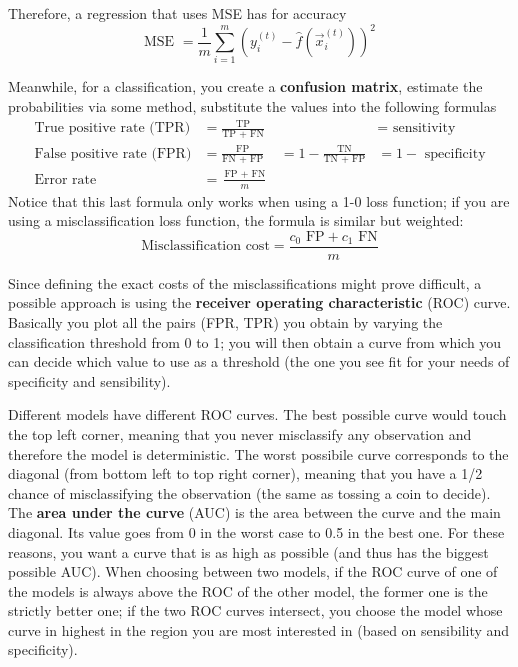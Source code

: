     Therefore, a regression that uses MSE has for accuracy
    $$\text{MSE } = \frac{1}{m} \sum_{i = 1}^{m}\left(y_i^{(t)} - 
                    \hat{f}\left(\vec{x}_i^{(t)}\right)\right)^2$$
    
    Meanwhile, for a classification, you create a \textbf{confusion matrix}, estimate the probabilities via some method, substitute the values into the following formulas
    \begin{align*}
      \text{True positive rate (TPR)} &= \frac{\text{TP}}{\text{TP } + \text{ FN}} &
        &= \text{ sensitivity} \\
      \text{False positive rate (FPR)} &= \frac{\text{FP}}{\text{FN } + \text{ FP}} 
        &= 1 - \frac{\text{TN}}{\text{TN } + \text{ FP}} &= 1 - \text{ specificity} \\
      \text{Error rate} &= \frac{\text{FP } + \text{ FN}}{m}
    \end{align*}
    Notice that this last formula only works when using a 1-0 loss function; if you are using a misclassification loss function, the formula is similar but weighted:
    $$\text{Misclassification cost}= \frac{c_0 \text{ FP} + c_1 \text{ FN}}{m}$$

    Since defining the exact costs of the misclassifications might prove difficult, a possible approach is using the \textbf{receiver operating characteristic} (ROC) curve. Basically you plot all the pairs (FPR, TPR) you obtain by varying the classification threshold from 0 to 1;
    you will then obtain a curve from which you can decide which value to use as a threshold (the one you see fit for your needs of specificity and sensibility). 
   

    Different models have different ROC curves.
    The best possible curve would touch the top left corner, meaning that you never misclassify any observation and therefore the model is deterministic.
    The worst possibile curve corresponds to the diagonal (from bottom left to top right corner), meaning that you have a 1/2 chance of misclassifying the observation (the same as tossing a coin to decide).
    The \textbf{area under the curve} (AUC) is the area between the curve and the main diagonal. Its value goes from 0 in the worst case to 0.5 in the best one. 
    For these reasons, you want a curve that is as high as possible (and thus has the biggest possible AUC). 
    When choosing between two models, if the ROC curve of one of the models is always above the ROC of the other model, the former one is the strictly better one; if the two ROC curves intersect, you choose the model whose curve in highest in the region you are most interested in (based on sensibility and specificity).    
  